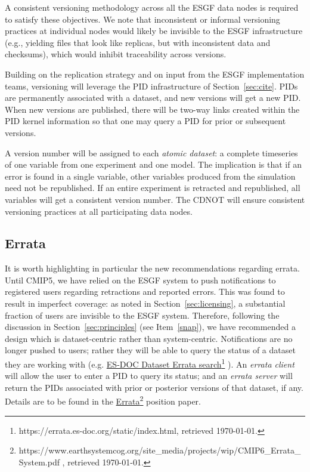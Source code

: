 \documentclass[gmd,manuscript]{copernicus}
\begin{document}
A consistent versioning methodology across all the ESGF data nodes is
required to satisfy these objectives. We note that inconsistent or
informal versioning practices at individual nodes would likely be
invisible to the ESGF infrastructure (e.g., yielding files that look
like replicas, but with inconsistent data and checksums), which would
inhibit traceability across versions.

Building on the replication strategy and on input from the ESGF
implementation teams, versioning will leverage the PID infrastructure
of Section~\ref{sec:cite}. PIDs are permanently associated with a
dataset, and new versions will get a new PID. When new versions are
published, there will be two-way links created within the PID kernel
information so that one may query a PID for prior or subsequent
versions.

A version number will be assigned to each \emph{atomic dataset}: a
complete timeseries of one variable from one experiment and one model.
The implication is that if an error is found in a single variable,
other variables produced from the simulation need not be republished.
If an entire experiment is retracted and republished, all variables
will get a consistent version number. The CDNOT will ensure consistent
versioning practices at all participating data nodes.

\subsection{Errata}
\label{sec:errata}

It is worth highlighting in particular the new recommendations
regarding errata. Until CMIP5, we have relied on the ESGF system to
push notifications to registered users regarding retractions and
reported errors. This was found to result in imperfect coverage: as
noted in Section~\ref{sec:licensing}, a substantial fraction of users
are invisible to the ESGF system. Therefore, following the discussion
in Section~\ref{sec:principles} (see Item~\ref{snap}), we have
recommended a design which is dataset-centric rather than
system-centric. Notifications are no longer pushed to users; rather
they will be able to query the status of a dataset they are working
with (e.g.
\href{https://errata.es-doc.org/static/index.html}{ES-DOC Dataset
  Errata search}\footnote{https://errata.es-doc.org/static/index.html,
  retrieved \today.} ).
An \emph{errata client} will allow the user to enter a PID to
query its status; and an \emph{errata server} will return the PIDs
associated with prior or posterior versions of that dataset, if any.
Details are to be found in the \href{https://www.earthsystemcog.org/site_media/projects/wip/CMIP6_Errata_System.pdf
}{Errata}\footnote{https://www.earthsystemcog.org/site\_media/projects/wip/CMIP6\_Errata\_System.pdf
, retrieved \today.} 
position paper.
\end{document}
